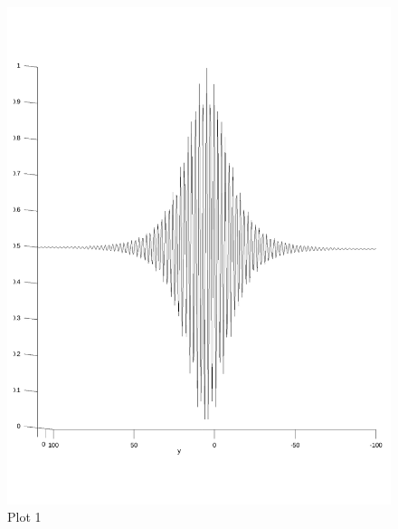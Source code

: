 \documentclass{article}
\begin{document}
\begin{figure}[h!]
\centering
\includegraphics[scale=.3]{images/myplot1.pdf}
\caption{Plot 1}
\label{fig:plot1_f6}
\end{figure}
\end{document}
